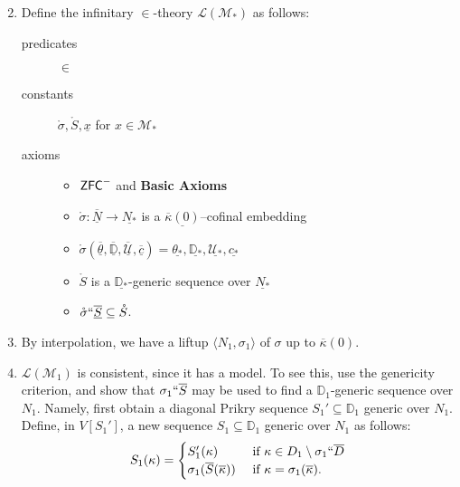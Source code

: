 \documentclass[utf8x,xcolor=svgnames,8pt]{beamer}
\newcommand{\M}{\mathcal{M}}
\newcommand{\D}{\mathbb{D}}
\newcommand{\N}{{\overline{N}}}
\renewcommand{\U}{\mathcal{U}}
\newcommand{\ZFC}{\textup{\ensuremath{\textsf{ZFC}}}}
\newcommand{\To}{\longrightarrow}
\begin{document}
\begin{frame}
\begin{enumerate} \setcounter{enumi}{1}
	\item Define the infinitary $\in$-theory $\mathcal L(\mathcal M_*)$ as follows: \begin{description}
	\item[predicates] $\in$ 
	\item[constants] $\mathring{\sigma}, \mathring S, \underline x$ for $x \in \mathcal M_*$
	\item[axioms] \begin{itemize} \item $\ZFC^-$ and \textbf{Basic Axioms}
		\item $\mathring \sigma : \underline \N \To \underline{N_*}$ is a $\underline{\overline \kappa(0)}$--cofinal embedding
		\item $\mathring{\sigma}(\overline{\underline{\theta}}, \overline{\underline{\D}}, \overline{\underline{\U}}, \overline{\underline c})=\underline{\theta_*}, \underline{\D_*}, \underline{\U_*}, \underline{c_*}$
		\item $\mathring S$ is a $\underline{\D_*}$-generic sequence over $\underline{N_*}$
		\item $\mathring \sigma ``\overline{\underline S} \subseteq \mathring S$.
	\end{itemize}
\end{description} 
	\item By interpolation, we have a liftup $\langle N_1, \sigma_1\rangle$ of $\sigma$ up to $\overline \kappa(0)$. 
	\item $\mathcal L(\M_1)$ is consistent, since it has a model. To see this, use the genericity criterion, and show that $\sigma_1``\overline S$ may be used to find a $\D_1$-generic sequence over $N_1$. Namely, first obtain a diagonal Prikry sequence $S_1' \subseteq \D_1$ generic over $N_1$. Define, in $V[S_1']$, a new sequence $S_1 \subseteq \D_1$ generic over $N_1$ as follows:
$$S_1(\kappa) = \begin{cases} S_1'(\kappa) &\text{ if } \kappa \in D_1 \setminus \sigma_1``\overline D \\
					\sigma_1(\overline S(\overline \kappa)) &\text{ if } \kappa = \sigma_1(\overline \kappa). \end{cases}$$ 
\end{enumerate}
\end{frame}
\end{document}
